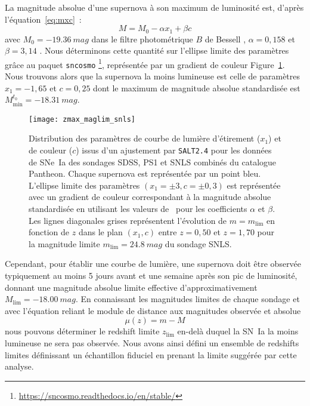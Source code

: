 \documentclass[../main/main.tex]{subfiles}
\begin{document}
La magnitude absolue d'une supernova à son maximum de luminosité est, d'après
l'équation~\ref{eq:mxc}~:
\begin{equation*}
    M = M_0 -\alpha x_1 + \beta c
\end{equation*}
avec $M_0 = \SI{-19,36}{mag}$ dans le filtre photométrique $B$ de Bessell
\citep{kessler2009a, scolnic2014}, $\alpha=0,158$ et $\beta=3,14$
\citep[Table 7,][]{scolnic2018}. Nous déterminons cette quantité sur l'ellipse
limite des paramètres grâce au paquet \texttt{sncosmo}
\footnote{\href{https://sncosmo.readthedocs.io/en/stable/}
{https://sncosmo.readthedocs.io/en/stable/}}, représentée par un gradient de
couleur Figure~\ref{fig:maglim}. Nous trouvons alors que la supernova la moins
lumineuse est celle de paramètres $x_1 = -1,65$ et $c = 0,25$ dont le maximum de
magnitude absolue standardisée est $M_{\min}^{t_0}=\SI{-18,31}{mag}$.

\begin{figure}
    \centering
    \texttt{[image: zmax\_maglim\_snls]}
    \caption[Distribution et limite des paramètres de courbe de lumière
    d'étirement ($x_1$) et de couleur ($c$) des sondages SDSS, PS1 et SNLS
    combinés du catalogue Pantheon]{Distribution des paramètres de courbe de
        lumière d'étirement ($x_1$) et de couleur ($c$) issus d'un ajustement
        par \texttt{SALT2.4} pour les données de SNe~Ia des sondages SDSS, PS1 et
        SNLS combinés du catalogue Pantheon. Chaque supernova est représentée par un
        point bleu. L'ellipse limite des paramètres $(x_1=\pm3, c=\pm0,3)$ est
        représentée avec un gradient de couleur correspondant à la magnitude
        absolue standardisée en utilisant les valeurs de~\cite{scolnic2018} pour
        les coefficients $\alpha$ et $\beta$. Les lignes diagonales grises
        représentent l'évolution de $m = m_{\lim}$ en fonction de $z$ dans le
        plan $(x_1,c)$ entre $z=0,50$ et $z=1,70$ pour la magnitude limite
    $m_{\lim}=\SI{24,8}{mag}$ du sondage SNLS.}
    \label{fig:maglim}
\end{figure}

Cependant, pour établir une courbe de lumière, une supernova doit être observée
typiquement au moins 5 jours avant et une semaine après son pic de luminosité,
donnant une magnitude absolue limite effective d'approximativement $M_{\lim} =
\SI{-18,00}{mag}$. En connaissant les magnitudes limites de chaque sondage et
avec l'équation reliant le module de distance aux magnitudes observée et absolue
\begin{equation}\label{eq:distmod}
    \mu(z) = m - M
\end{equation}
nous pouvons déterminer le redshift limite $z_{\lim}$ en-delà duquel la SN~Ia la
moins lumineuse ne sera pas observée. Nous avons ainsi défini un ensemble de
redshifts limites définissant un échantillon fiduciel en prenant la limite
suggérée par cette analyse.
\end{document}
